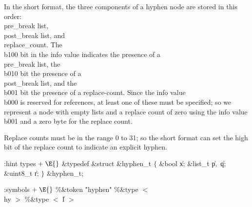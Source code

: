 In the short format, the three components of a hyphen node are stored in this order:
\\{pre\_break} list, \\{post\_break} list, and  \\{replace\_count}.
The \\{b100} bit in the info value indicates the presence of a
\\{pre\_break} list, the \\{b010} bit the presence of a \\{post\_break} list, and
the \\{b001} bit the presence of a replace-count.
Since the info value \\{b000} is
reserved for references, at least one of these must be specified; so we represent
a node with empty lists and a replace count of zero using the info value \\{b001}
and a zero byte for the replace count.

Replace counts must be in the range 0 to 31; so the short format can set the high bit
of the replace count to indicate an explicit hyphen.

\Y\B\4:hint types\X${}\mathrel+\E{}$\6
\&{typedef} \&{struct} \&{hyphen\_t}\5
${}\{{}$\5
\1\&{bool} \|x;\5
\&{list\_t} \|p${},{}$ \|q;\5
\&{uint8\_t} \|r;\5
\2${}\}{}$ \&{hyphen\_t};
\Y
\fi



\readcode
\Y\par
\par
\par
\par
\Y\B\4:symbols\X${}\mathrel+\E{}$\6
\8\%\&{token} \5\.{"hyphen"}\6
\8\%\&{type} $<$ \\{hy} $>$ \5
 \6
\8\%\&{type} $<$ \|l $>$ 
\Y
\fi

